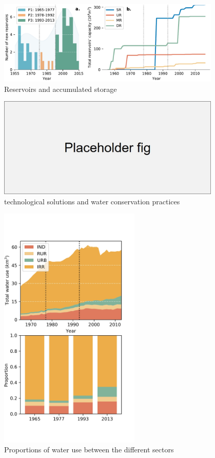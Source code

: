 \documentclass[9pt,twoside,lineno]{pnas-new}
\begin{document}
\begin{figure}
    \centering
    \includegraphics[width=0.95\textwidth]{../../figures/supplementary_information/reservoirs.pdf}
    \caption{Reservoirs and accumulated storage}
\end{figure}


\begin{figure}
    \centering
    \includegraphics[width=0.95\textwidth]{../../figures/placeholder_l.jpg}
    \caption{technological solutions and water conservation practices}
\end{figure}

\begin{figure}
    \centering
    \includegraphics[width=0.6\textwidth]{../../figures/supplementary_information/sf_wu_sections_stackplot.jpg}
    \caption{Proportions of water use between the different sectors}
\end{figure}
\end{document}
